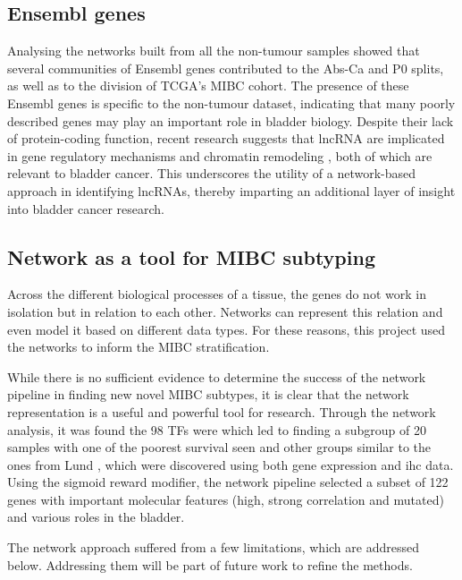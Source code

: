 \subsection*{Ensembl genes}

Analysing the networks built from all the non-tumour samples showed that several communities of Ensembl genes contributed to the Abs-Ca and P0 splits, as well as to the division of TCGA's MIBC cohort. The presence of these Ensembl genes is specific to the non-tumour dataset, indicating that many poorly described genes may play an important role in bladder biology. Despite their lack of protein-coding function, recent research suggests that \acrlong{lncRNA} are implicated in gene regulatory mechanisms and chromatin remodeling \citep{Statello2021-md}, both of which are relevant to bladder cancer. This underscores the utility of a network-based approach in identifying lncRNAs, thereby imparting an additional layer of insight into bladder cancer research.

\subsection*{Network as a tool for MIBC subtyping}

Across the different biological processes of a tissue, the genes do not work in isolation but in relation to each other. Networks can represent this relation and even model it based on different data types. For these reasons, this project used the networks to inform the MIBC stratification. 

While there is no sufficient evidence to determine the success of the network pipeline in finding new novel MIBC subtypes, it is clear that the network representation is a useful and powerful tool for research. Through the network analysis, it was found the 98 TFs were which led to finding a subgroup of 20 samples with one of the poorest survival seen and other groups similar to the ones from Lund \citep{Marzouka2018-ge}, which were discovered using both gene expression and \acrshort{ihc} data. Using the sigmoid reward modifier, the network pipeline selected a subset of 122 genes with important molecular features (high, strong correlation and mutated) and various roles in the bladder.

The network approach suffered from a few limitations, which are addressed below. Addressing them will be part of future work to refine the methods.


